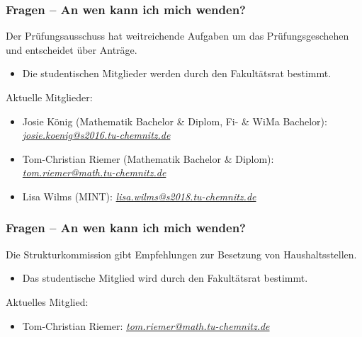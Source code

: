 \documentclass[10pt]{beamer}
\begin{document}
\begin{frame}
	\frametitle{Fragen -- An wen kann ich mich wenden?}

	\begin{block}{\vphantom{X}}
		Der Prüfungsausschuss hat weitreichende Aufgaben um das Prüfungsgeschehen und entscheidet über Anträge.
	\end{block}

	\begin{itemize}
		\item Die studentischen Mitglieder werden durch den Fakultätsrat bestimmt.
	\end{itemize}

	\vspace*{0.5cm}

	Aktuelle Mitglieder:

	\begin{itemize}
		\item Josie König (Mathematik Bachelor \& Diplom, Fi- \& WiMa Bachelor): \textit{\href{mailto:josie.koenig@s2016.tu-chemnitz.de}{josie.koenig@s2016.tu-chemnitz.de}}
		\item Tom-Christian Riemer (Mathematik Bachelor \& Diplom): \textit{\href{mailto:tom.riemer@math.tu-chemnitz.de}{tom.riemer@math.tu-chemnitz.de}}
		\item Lisa Wilms (MINT): \textit{\href{mailto:lisa.wilms@s2018.tu-chemnitz.de}{lisa.wilms@s2018.tu-chemnitz.de}}
	\end{itemize}
\end{frame}

\begin{frame}
	\frametitle{Fragen -- An wen kann ich mich wenden?}

	\begin{block}{\vphantom{X}}
		Die Strukturkommission gibt Empfehlungen zur Besetzung von Haushaltsstellen.
	\end{block}

	\begin{itemize}
		\item Das studentische Mitglied wird durch den Fakultätsrat bestimmt.
	\end{itemize}

	\vspace*{1.0cm}

	Aktuelles Mitglied:

	\begin{itemize}
		\item Tom-Christian Riemer: \textit{\href{mailto:tom.riemer@math.tu-chemnitz.de}{tom.riemer@math.tu-chemnitz.de}}
	\end{itemize}
\end{frame}
\end{document}
